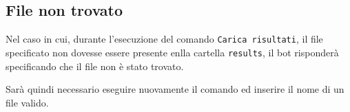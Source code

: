 
\subsection{File non trovato}

Nel caso in cui, durante l'esecuzione del comando \texttt{Carica risultati}, il file specificato non dovesse essere presente enlla cartella \texttt{results}, il bot risponderà specificando che il file non è stato trovato. 


Sarà quindi necessario eseguire nuovamente il comando ed inserire il nome di un file valido. 
